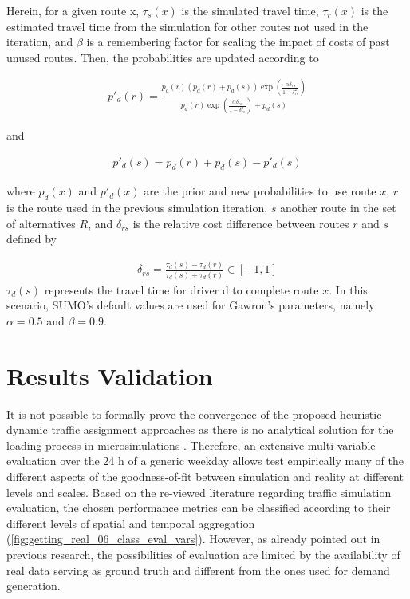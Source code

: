 Herein, for a given route x, $\tau_s(x)$ is the simulated travel time, $\tau_r(x)$ is the estimated travel time from the simulation for other routes not used in the iteration, and $\beta$ is a remembering factor for scaling the impact of costs of past unused routes. Then, the probabilities are updated according to

\begin{align}
   p'_d(r) = \frac{p_d(r) \left(p_d(r) + p_d(s)\right) \exp\left(\frac{\alpha \delta_{rs}}{1 - \delta_{rs}^2}\right)}{p_d(r) \exp\left(\frac{\alpha \delta_{rs}}{1 - \delta_{rs}^2}\right) + p_d(s)} \label{eq:GR_gawron_prob_update1}
\end{align}

and

\begin{align}
   p'_d(s) = p_d(r) + p_d(s) - p'_d(s) \label{eq:GR_gawron_prob_update2}
\end{align}

where $p_d (x)$ and $p'_d (x)$ are the prior and new probabilities to use route $x$, $r$ is the route used in the previous simulation iteration, $s$ another route in the set of alternatives $R$, and $\delta_{rs}$ is the relative cost difference between routes $r$ and $s$ defined by

\begin{align}
   \delta_{rs} = \frac{\tau_d(s) - \tau_d(r)}{\tau_d(s) + \tau_d(r)} \in [-1, 1] \label{eq:GR_gawron_delta_rs}
\end{align}
$\tau_d (s)$ represents the travel time for driver d to complete route $x$. In this scenario, SUMO’s default values are used for Gawron’s parameters, namely $\alpha=0.5$ and $\beta=0.9$.

\section{Results Validation}
\label{sec:GR_3_val}

It is not possible to formally prove the convergence of the proposed heuristic dynamic traffic assignment approaches as there is no analytical solution for the loading process in microsimulations \citep{Barcelo2006,Batty2013}. Therefore, an extensive multi-variable evaluation over the 24 h of a generic weekday allows test empirically many of the different aspects of the goodness-of-fit between simulation and reality at different levels and scales. Based on the re-viewed literature regarding traffic simulation evaluation, the chosen performance metrics can be classified according to their different levels of spatial and temporal aggregation (\autoref{fig:getting_real_06_class_eval_vars}). However, as already pointed out in previous research, the possibilities of evaluation are limited by the availability of real data serving as ground truth and different from the ones used for demand generation.

